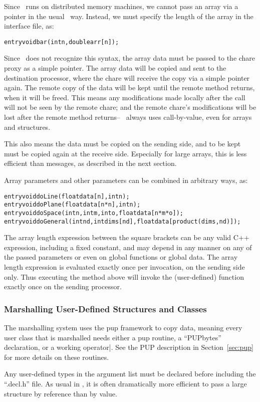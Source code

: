 Since \charmpp\ runs on distributed memory machines, we cannot
pass an array via a pointer in the usual \CC\ way.  Instead,
we must specify the length of the array in the interface file, as:
\begin{alltt}
  entry void bar(int n,double arr[n]);
\end{alltt}
Since \CC\ does not recognize this syntax, the array data
must be passed to the chare proxy as a simple pointer.
The array data will be copied and sent to the
destination processor, where the chare will receive the copy
via a simple pointer again.  The remote copy of the data
will be kept until the remote method returns, when
it will be freed.  
This means any modifications made locally after the call will not be 
seen by the remote chare; and the remote chare's modifications
will be lost after the remote method returns-- \charmpp\ always 
uses call-by-value, even for arrays and structures.  

This also means the data must be copied on the sending 
side, and to be kept must be copied again 
at the receive side.  Especially for large arrays, this 
is less efficient than messages, as described in the next section.

Array parameters and other parameters can be combined in arbitrary ways, as:
\begin{alltt}
  entry void doLine(float data[n],int n);
  entry void doPlane(float data[n*n],int n);
  entry void doSpace(int n,int m,int o,float data[n*m*o]);
  entry void doGeneral(int nd,int dims[nd],float data[product(dims,nd)]);
\end{alltt}
The array length expression between the square brackets can be 
any valid C++ expression, including a fixed constant, and may depend 
in any manner on any of the passed
parameters or even on global functions or global data.  The array length 
expression is evaluated exactly once per invocation, on the sending side only.
Thus executing the  method above will invoke the 
(user-defined)  function exactly once on the sending
processor.

\subsubsection{Marshalling User-Defined Structures and Classes}

The marshalling system uses the pup framework to copy data,
meaning every user class that is marshalled needs either a
pup routine, a ``PUPbytes'' declaration, or a working operator|.
See the PUP description in Section~\ref{sec:pup} for more details 
on these routines.

Any user-defined types in the argument list must be declared 
before including the ``.decl.h'' file.
As usual in \CC, it is often dramatically more efficient to pass
a large structure by reference than by value.

